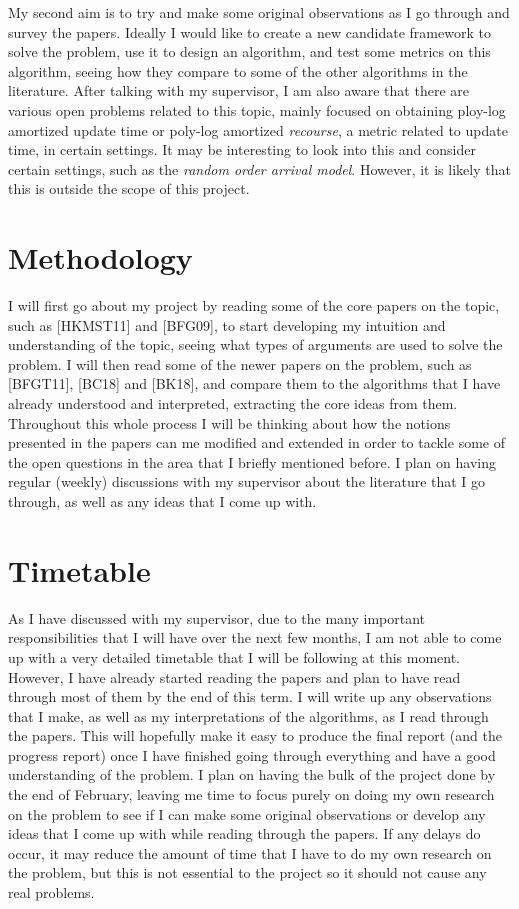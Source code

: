 \documentclass{article}
\begin{document}
My second aim is to try and make some original observations as I go through and survey the papers. Ideally I would like to create a new candidate framework to solve the problem, use it to design an algorithm, and test some metrics on this algorithm, seeing how they compare to some of the other algorithms in the literature. After talking with my supervisor, I am also aware that there are various open problems related to this topic, mainly focused on obtaining ploy-log amortized update time or poly-log amortized \textit{recourse}, a metric related to update time, in certain settings. It may be interesting to look into this and consider certain settings, such as the \textit{random order arrival model}. However, it is likely that this is outside the scope of this project.

\section{Methodology}

I will first go about my project by reading some of the core papers on the topic, such as [HKMST11] and [BFG09], to start developing my intuition and understanding of the topic, seeing what types of arguments are used to solve the problem. I will then read some of the newer papers on the problem, such as [BFGT11], [BC18] and [BK18], and compare them to the algorithms that I have already understood and interpreted, extracting the core ideas from them. Throughout this whole process I will be thinking about how the notions presented in the papers can me modified and extended in order to tackle some of the open questions in the area that I briefly mentioned before. I plan on having regular (weekly) discussions with my supervisor about the literature that I go through, as well as any ideas that I come up with.

\section{Timetable}

As I have discussed with my supervisor, due to the many important responsibilities that I will have over the next few months, I am not able to come up with a very detailed timetable that I will be following at this moment. However, I have already started reading the papers and plan to have read through most of them by the end of this term. I will write up any observations that I make, as well as my interpretations of the algorithms, as I read through the papers. This will hopefully make it easy to produce the final report (and the progress report) once I have finished going through everything and have a good understanding of the problem. I plan on having the bulk of the project done by the end of February, leaving me time to focus purely on doing my own research on the problem to see if I can make some original observations or develop any ideas that I come up with while reading through the papers. If any delays do occur, it may reduce the amount of time that I have to do my own research on the problem, but this is not essential to the project so it should not cause any real problems.
\end{document}

